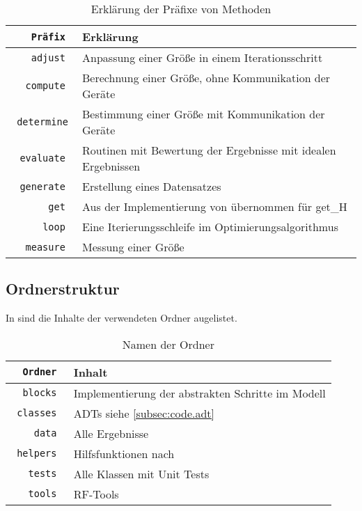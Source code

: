 \documentclass[../Report.tex]{subfiles}
\begin{document}
\begin{table}[H]
\centering 
\begin{tabular}[t]{| >{\texttt\bgroup}r<{\egroup} | l |} 
  \hline
    \textrm{Präfix} & Erklärung \\ 
  \hline \hline
    adjust & Anpassung einer Größe in einem Iterationsschritt	\\
  \hline
    compute & Berechnung einer Größe, ohne Kommunikation der Geräte \\ 
  \hline
    determine & Bestimmung einer Größe mit Kommunikation der Geräte 	\\
  \hline 
    evaluate & Routinen mit Bewertung der Ergebnisse mit idealen Ergebnissen \\  
  \hline 
    generate & Erstellung eines Datensatzes \\
  \hline
    get & Aus der Implementierung von \cite{PJS_Denys} übernommen für get\_H \\
  \hline
    loop & Eine Iterierungsschleife im Optimierungsalgorithmus \\  
  \hline  
    measure & Messung einer Größe \\  
  \hline
\end{tabular}
\caption{Erklärung der Präfixe von Methoden}
\label{tab:code.namen}
\end{table}

\subsection{Ordnerstruktur}
\label{subsec:code.ordner}
In  sind die Inhalte der verwendeten Ordner augelistet.

\begin{table}[H]
\centering 
\begin{tabular}[t]{| >{\texttt\bgroup}r<{\egroup} | l |} 
  \hline
    \textrm{Ordner} & Inhalt \\ 
  \hline \hline
    blocks & Implementierung der abstrakten Schritte im Modell	\\
  \hline  
    classes & ADTs siehe \ref{subsec:code.adt} \\  
  \hline
    data & Alle Ergebnisse \\ 
  \hline
    helpers & Hilfsfunktionen nach \cite{helper_class} 	\\
  \hline 
    tests & Alle Klassen mit Unit Tests \\  
  \hline 
    tools & RF-Tools \\ 
  \hline
\end{tabular}
\caption{Namen der Ordner}
\label{tab:code.ordner}
\end{table}
\end{document}

